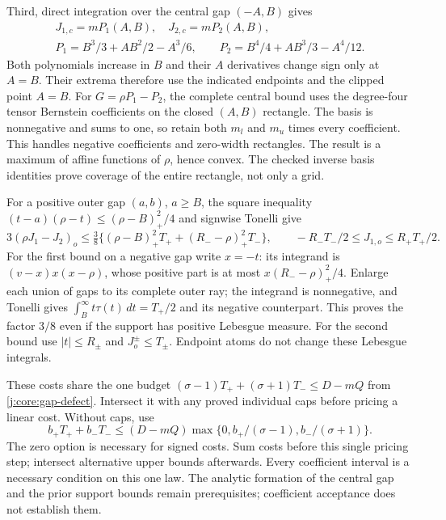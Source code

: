 Third, direct integration over the central gap $(-A,B)$ gives
\begin{gather*}
 J_{1,c}=mP_1(A,B),\quad J_{2,c}=mP_2(A,B),\\
 P_1=B^3/3+AB^2/2-A^3/6,\qquad
 P_2=B^4/4+AB^3/3-A^4/12.
\end{gather*}
Both polynomials increase in $B$ and their $A$ derivatives change sign
only at $A=B$. Their extrema therefore use the indicated endpoints and
the clipped point $A=B$. For $G=\rho P_1-P_2$, the complete central
bound uses the degree-four tensor Bernstein coefficients on the closed
$(A,B)$ rectangle. The basis is nonnegative and sums to one, so retain
both $m_l$ and $m_u$ times every coefficient. This handles negative
coefficients and zero-width rectangles. The result is a maximum of
affine functions of $\rho$, hence convex. The checked inverse basis
identities prove coverage of the entire rectangle, not only a grid.

For a positive outer gap $(a,b)$, $a\ge B$, the square inequality
$(t-a)(\rho-t)\le(\rho-B)_+^2/4$ and signwise Tonelli give
\[
 3(\rho J_1-J_2)_o\le\tfrac38
 \{(\rho-B)_+^2T_++(R_--\rho)_+^2T_-\},\qquad
 -R_-T_-/2\le J_{1,o}\le R_+T_+/2.
\]
For the first bound on a negative gap write $x=-t$: its integrand is
$(v-x)x(x-\rho)$, whose positive part is at most
$x(R_--\rho)_+^2/4$. Enlarge each union of gaps to its complete
outer ray; the integrand is nonnegative, and Tonelli gives
$\int_B^\infty t\tau(t)\,dt=T_+/2$ and its negative counterpart.
This proves the factor $3/8$ even if the support has positive Lebesgue
measure. For the second bound use
$|t|\le R_\pm$ and $J_o^\pm\le T_\pm$.
Endpoint atoms do not change these Lebesgue integrals.

These costs share the one budget
$(\sigma-1)T_++(\sigma+1)T_-\le D-mQ$ from
\eqref{j:core:gap-defect}. Intersect it with any proved individual
caps before pricing a linear cost. Without caps, use
\[
 b_+T_++b_-T_-\le(D-mQ)
 \max\{0,b_+/(\sigma-1),b_-/(\sigma+1)\}.
\]
The zero option is necessary for signed costs. Sum costs before this
single pricing step; intersect alternative upper bounds afterwards.
Every coefficient interval is a necessary condition on this one law.
The analytic formation of the central gap and the prior support bounds
remain prerequisites; coefficient acceptance does not establish them.
